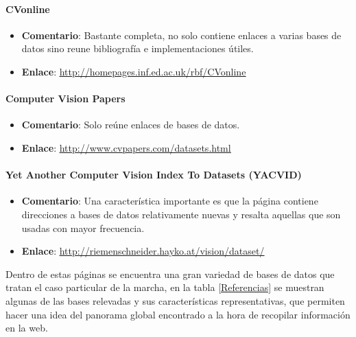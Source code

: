 \paragraph{\textbf{CVonline}}

	\begin{itemize}
		\item \textbf{Comentario}: Bastante completa, no solo contiene enlaces a  varias bases de datos sino reune bibliografía e implementaciones útiles.
		\item \textbf{Enlace}: \textcolor{blue}{\underline{\url{http://homepages.inf.ed.ac.uk/rbf/CVonline}}}
	\end{itemize}

\paragraph{\textbf{Computer Vision Papers}}
	\begin{itemize}
		\item \textbf{Comentario}: Solo reúne enlaces de bases de datos.
		\item \textbf{Enlace}: \textcolor{blue}{\underline{\url{ http://www.cvpapers.com/datasets.html}}}
	\end{itemize}
	
\paragraph{\textbf{Yet Another Computer Vision Index To Datasets (YACVID)}}		
	\begin{itemize}
		\item \textbf{Comentario}: Una característica importante es que la página contiene direcciones a bases de datos relativamente nuevas y resalta aquellas que son usadas con mayor frecuencia. 
		\item \textbf{Enlace}: \textcolor{blue}{\underline{\url{http://riemenschneider.hayko.at/vision/dataset/}}}
	\end{itemize}

Dentro de estas páginas se encuentra una gran variedad de bases de datos que tratan el caso particular de la marcha, en la tabla \ref{Referencias} se muestran algunas de las bases relevadas y sus características representativas, que permiten hacer una idea del panorama global encontrado a la hora de recopilar información en la web.  


